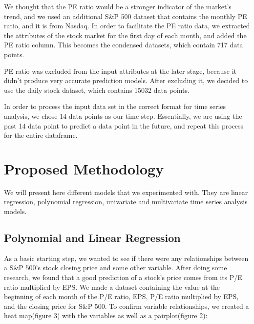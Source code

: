 \documentclass{article}
\begin{document}
We thought that the PE ratio would be a stronger indicator of the market’s trend, and we used an additional S\&P 500 dataset that contains the monthly PE ratio\cite{SNP_PE_Monthly}, and it is from Nasdaq. In order to facilitate the PE ratio data, we extracted the attributes of the stock market for the first day of each month, and added the PE ratio column. This becomes the condensed datasets, which contain 717 data points.

PE ratio was excluded from the input attributes at the later stage, because it didn’t produce very accurate prediction models. After excluding it, we decided to use the daily stock dataset, which contains 15032 data points.

In order to process the input data set in the correct format for time series analysis, we chose 14 data points as our time step. Essentially, we are using the past 14 data point to predict a data point in the future, and repeat this process for the entire dataframe.
 
\section{Proposed Methodology} 

We will present here different models that we experimented with. They are linear regression, polynomial regression, univariate and multivariate time series analysis models. 

\subsection{Polynomial and Linear Regression}

As a basic starting step, we wanted to see if there were any relationships between a S\&P 500’s stock closing price and some other variable. After doing some research, we found that a good prediction of a stock's price comes from its P/E ratio multiplied by EPS. We made a dataset containing the value at the beginning of each month of the P/E ratio, EPS, P/E ratio multiplied by EPS, and the closing price for S\&P 500. To confirm variable relationships, we created a heat map(figure 3) with the variables as well as a pairplot(figure 2):
\end{document}
